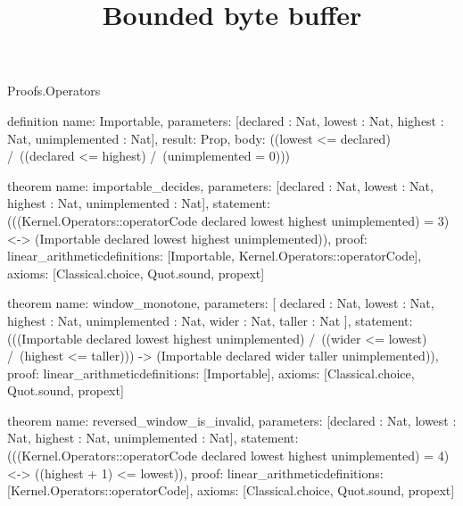 \begin{lexlean}{Proofs.Operators}
\title{Bounded byte buffer}
\begin{semanticmodule}
definition{
  name: Importable,
  parameters: [declared : Nat, lowest : Nat, highest : Nat, unimplemented : Nat],
  result: Prop,
  body: ((lowest <= declared) /\ ((declared <= highest) /\ (unimplemented = 0)))
}

theorem{
  name: importable_decides,
  parameters: [declared : Nat, lowest : Nat, highest : Nat, unimplemented : Nat],
  statement: (((Kernel.Operators::operatorCode declared lowest highest unimplemented) = 3) <-> (Importable declared lowest highest unimplemented)),
  proof: linear_arithmetic{definitions: [Importable, Kernel.Operators::operatorCode]},
  axioms: [Classical.choice, Quot.sound, propext]
}

theorem{
  name: window_monotone,
  parameters: [
    declared : Nat,
    lowest : Nat,
    highest : Nat,
    unimplemented : Nat,
    wider : Nat,
    taller : Nat
  ],
  statement: (((Importable declared lowest highest unimplemented) /\ ((wider <= lowest) /\ (highest <= taller))) -> (Importable declared wider taller unimplemented)),
  proof: linear_arithmetic{definitions: [Importable]},
  axioms: [Classical.choice, Quot.sound, propext]
}

theorem{
  name: reversed_window_is_invalid,
  parameters: [declared : Nat, lowest : Nat, highest : Nat, unimplemented : Nat],
  statement: (((Kernel.Operators::operatorCode declared lowest highest unimplemented) = 4) <-> ((highest + 1) <= lowest)),
  proof: linear_arithmetic{definitions: [Kernel.Operators::operatorCode]},
  axioms: [Classical.choice, Quot.sound, propext]
}
\end{semanticmodule}
\end{lexlean}
